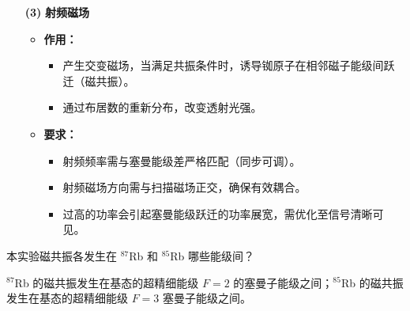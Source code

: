 \begin{itemize}
    \item[\textbf{(3)}] \textbf{射频磁场}
    \begin{itemize}
        \item \textbf{作用：} 
        \begin{itemize}
            \item 产生交变磁场，当满足共振条件时，诱导铷原子在相邻磁子能级间跃迁（磁共振）。
            \item 通过布居数的重新分布，改变透射光强。
        \end{itemize}
        \item \textbf{要求：}
        \begin{itemize}
            \item 射频频率需与塞曼能级差严格匹配（同步可调）。
            \item 射频磁场方向需与扫描磁场正交，确保有效耦合。
            \item 过高的功率会引起塞曼能级跃迁的功率展宽，需优化至信号清晰可见。
        \end{itemize}
    \end{itemize}
\end{itemize}

\begin{question}
本实验磁共振各发生在 $^{87}$Rb 和 $^{85}$Rb 哪些能级间？
\end{question}

$^{87}$Rb 的磁共振发生在基态的超精细能级 $F = 2$ 的塞曼子能级之间；$^{85}$Rb 的磁共振发生在基态的超精细能级 $F = 3$ 塞曼子能级之间。